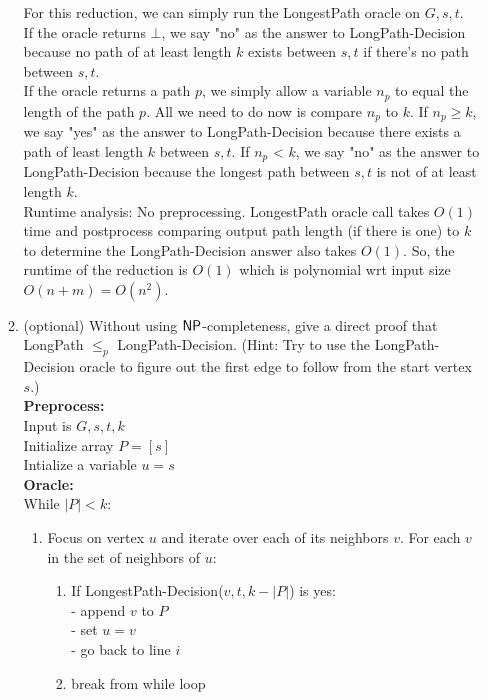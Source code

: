 \documentclass[11pt]{article}
\begin{document}
\begin{enumerate}
\begin{enumerate}
For this reduction, we can simply run the LongestPath oracle on $G,s,t$. \\ 

If the oracle returns $\bot$, we say "no" as the answer to LongPath-Decision because no path of at least length $k$ exists between $s,t$ if there's no path between $s,t$. \\

If the oracle returns a path $p$, we simply allow a variable $n_p$ to equal the length of the path $p$. All we need to do now is compare $n_p$ to $k$. If $n_p \geq k$, we say "yes" as the answer to LongPath-Decision because there exists a path of least length $k$ between $s,t$. If $n_p$ < $k$, we say "no" as the answer to LongPath-Decision because the longest path between $s,t$ is not of at least length $k$.  \\

Runtime analysis: No preprocessing. LongestPath oracle call takes $O(1)$ time and postprocess comparing output path length (if there is one) to $k$ to determine the LongPath-Decision answer also takes $O(1)$. So, the runtime of the reduction is $O(1)$ which is polynomial wrt input size $O(n+m)=O(n^2)$. \\


\item (optional) Without using $\mathsf{NP}$-completeness, give a direct proof that LongPath $\leq_p$ LongPath-Decision.
(Hint: Try to use the LongPath-Decision oracle to figure out the first edge to follow from the start vertex $s$.) \\

\textbf{Preprocess:} \\

Input is $G,s,t,k$ \\
Initialize array $P = [s]$ \\
Intialize a variable $u=s$ \\

\textbf{Oracle:} \\

While $|P| < k$:
\begin{enumerate}
    \item Focus on vertex $u$ and iterate over each of its neighbors $v$. For each $v$ in the set of neighbors of $u$:
    \begin{enumerate}
        \item If LongestPath-Decision($v,t,k - |P|$) is yes: \\
                - append $v$ to $P$ \\
                - set $u = v$ \\
                - go back to line $i$
        \item break from while loop \\
    \end{enumerate}
\end{enumerate}


\end{enumerate}
\end{enumerate}
\end{document}
